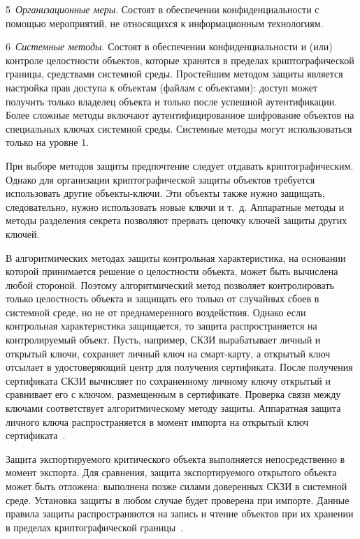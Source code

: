 5~{\it Организационные меры}. 
Состоят в обеспечении конфиденциальности с помощью мероприятий,
не относящихся к информационным технологиям.

6~{\it Системные методы}. 
Состоят в обеспечении конфиденциальности и (или) контроле целостности объектов, 
которые хранятся в пределах криптографической границы, средствами системной 
среды. Простейшим методом защиты является настройка прав доступа к объектам 
(файлам с объектами): доступ может получить только владелец объекта и только 
после успешной аутентификации. Более сложные методы включают 
аутентифицированное шифрование объектов на специальных ключах системной среды.
%
Системные методы могут использоваться только на уровне 1.

При выборе методов защиты предпочтение следует отдавать криптографическим.
Однако для организации криптографической защиты объектов требуется использовать
другие объекты-ключи. Эти объекты также нужно защищать, следовательно, нужно
использовать новые ключи и т.~д. Аппаратные методы и методы разделения секрета
позволяют прервать цепочку ключей защиты других ключей.

В алгоритмических методах защиты контрольная характеристика, 
на основании которой принимается решение о целостности объекта, 
может быть вычислена любой стороной. Поэтому алгоритмический метод позволяет 
контролировать только целостность объекта и защищать его только от случайных 
сбоев в системной среде, но не от преднамеренного воздействия. 
%
Однако если контрольная характеристика защищается, то защита распространяется
на контролируемый объект. 
%
Пусть, например, СКЗИ вырабатывает личный и открытый ключи,
сохраняет личный ключ на смарт-карту, 
а открытый ключ отсылает в удостоверяющий центр для получения сертификата. 
%
После получения сертификата СКЗИ вычисляет по сохраненному личному ключу 
открытый и сравнивает его с ключом, размещенным в сертификате.
%
Проверка связи между ключами соответствует алгоритмическому методу защиты.
Аппаратная защита личного ключа распространяется в момент импорта
на открытый ключ сертификата~.

Защита экспортируемого критического объекта выполняется непосредственно в момент
экспорта. Для сравнения, защита экспортируемого открытого объекта может быть
отложена: выполнена позже силами доверенных СКЗИ в системной среде.
%
Установка защиты в любом случае будет проверена при импорте. 
%
Данные правила защиты распространяются на запись и чтение объектов при 
их хранении в пределах криптографической границы~. 

